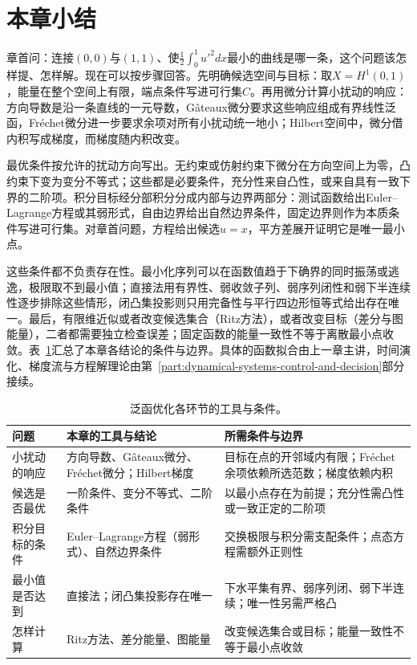 
\section{本章小结}
\label{sec:opt-fn-summary}

章首问：连接$(0,0)$与$(1,1)$、使$\frac12\int_0^1u'^2dx$最小的曲线是哪一条，这个问题该怎样提、怎样解。现在可以按步骤回答。先明确候选空间与目标：取$X=H^1(0,1)$，能量在整个空间上有限，端点条件写进可行集$C$。再用微分计算小扰动的响应：方向导数是沿一条直线的一元导数，Gâteaux微分要求这些响应组成有界线性泛函，Fréchet微分进一步要求余项对所有小扰动统一地小；Hilbert空间中，微分借内积写成梯度，而梯度随内积改变。

最优条件按允许的扰动方向写出。无约束或仿射约束下微分在方向空间上为零，凸约束下变为变分不等式；这些都是必要条件，充分性来自凸性，或来自具有一致下界的二阶项。积分目标经分部积分分成内部与边界两部分：测试函数给出Euler--Lagrange方程或其弱形式，自由边界给出自然边界条件，固定边界则作为本质条件写进可行集。对章首问题，方程给出候选$u=x$，平方差展开证明它是唯一最小点。

这些条件都不负责存在性。最小化序列可以在函数值趋于下确界的同时振荡或逃逸，极限取不到最小值；直接法用有界性、弱收敛子列、弱序列闭性和弱下半连续性逐步排除这些情形，闭凸集投影则只用完备性与平行四边形恒等式给出存在唯一。最后，有限维近似或者改变候选集合（Ritz方法），或者改变目标（差分与图能量），二者都需要独立检查误差；固定函数的能量一致性不等于离散最小点收敛。表~\ref{tab:opt-fn-summary}汇总了本章各结论的条件与边界。具体的函数拟合由上一章主讲，时间演化、梯度流与方程解理论由第~\ref{part:dynamical-systems-control-and-decision}部分接续。

\begin{table}[!htb]
  \centering
  \small
  \begin{tabularx}{\linewidth}{@{}l>{\raggedright\arraybackslash}X>{\raggedright\arraybackslash}X@{}}
    \toprule
    问题 & 本章的工具与结论 & 所需条件与边界 \\
    \midrule
    小扰动的响应 & 方向导数、Gâteaux微分、Fréchet微分；Hilbert梯度 & 目标在点的开邻域内有限；Fréchet余项依赖所选范数；梯度依赖内积 \\
    候选是否最优 & 一阶条件、变分不等式、二阶条件 & 以最小点存在为前提；充分性需凸性或一致正定的二阶项 \\
    积分目标的条件 & Euler--Lagrange方程（弱形式）、自然边界条件 & 交换极限与积分需支配条件；点态方程需额外正则性 \\
    最小值是否达到 & 直接法；闭凸集投影存在唯一 & 下水平集有界、弱序列闭、弱下半连续；唯一性另需严格凸 \\
    怎样计算 & Ritz方法、差分能量、图能量 & 改变候选集合或目标；能量一致性不等于最小点收敛 \\
    \bottomrule
  \end{tabularx}
  \caption{泛函优化各环节的工具与条件。}
  \label{tab:opt-fn-summary}
\end{table}
